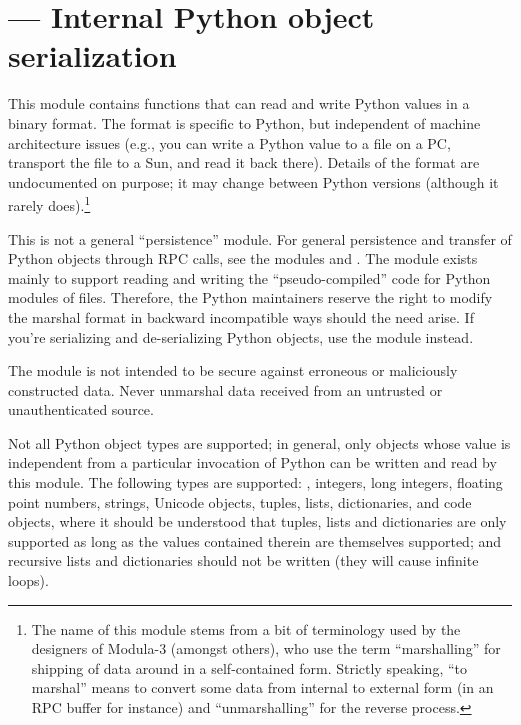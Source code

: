 \section{ ---
         Internal Python object serialization}



This module contains functions that can read and write Python
values in a binary format.  The format is specific to Python, but
independent of machine architecture issues (e.g., you can write a
Python value to a file on a PC, transport the file to a Sun, and read
it back there).  Details of the format are undocumented on purpose;
it may change between Python versions (although it rarely
does).\footnote{The name of this module stems from a bit of
  terminology used by the designers of Modula-3 (amongst others), who
  use the term ``marshalling'' for shipping of data around in a
  self-contained form. Strictly speaking, ``to marshal'' means to
  convert some data from internal to external form (in an RPC buffer for
  instance) and ``unmarshalling'' for the reverse process.}

This is not a general ``persistence'' module.  For general persistence
and transfer of Python objects through RPC calls, see the modules
 and .  The  module exists
mainly to support reading and writing the ``pseudo-compiled'' code for
Python modules of  files.  Therefore, the Python
maintainers reserve the right to modify the marshal format in backward
incompatible ways should the need arise.  If you're serializing and
de-serializing Python objects, use the  module instead.  

\begin{notice}[warning]
The  module is not intended to be secure against
erroneous or maliciously constructed data.  Never unmarshal data
received from an untrusted or unauthenticated source.
\end{notice}

Not all Python object types are supported; in general, only objects
whose value is independent from a particular invocation of Python can
be written and read by this module.  The following types are supported:
, integers, long integers, floating point numbers,
strings, Unicode objects, tuples, lists, dictionaries, and code
objects, where it should be understood that tuples, lists and
dictionaries are only supported as long as the values contained
therein are themselves supported; and recursive lists and dictionaries
should not be written (they will cause infinite loops).

